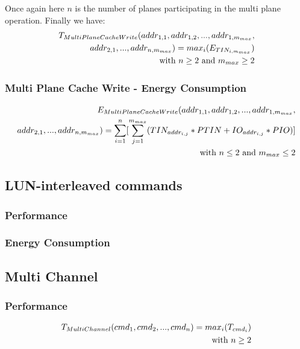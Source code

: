 \documentclass[oneside]{memoir}
\begin{document}
Once again here $n$ is the number of planes participating in the multi plane operation. Finally we have:
\begin{align}
T_{MultiPlaneCacheWrite} (addr_{1,1}, addr_{1,2}, ... , addr_{1,m_{max}}, 
\notag\\addr_{2,1}, ... , addr_{n,m_{max}}) = max_i(E_{TIN_{i, m_{max}}})
\notag\\\text{with } n \ge 2 \text{ and } m_{max} \ge 2
\end{align}


\subsubsection{Multi Plane Cache Write - Energy Consumption}
\begin{align}
E_{MultiPlaneCacheWrite} (addr_{1,1}, addr_{1,2}, ... , addr_{1,m_{max}}, 
\notag\\addr_{2,1}, ... , addr_{n,m_{max}}) = 
\sum\limits_{i=1}^{n} [\sum\limits_{j=1}^{m_{max}} (TIN_{addr_{i,j}}*PTIN + IO_{addr_{i,j}}*PIO)]
\notag\\\text{with } n \le 2 \text{ and } m_{max} \le 2
\end{align}

\subsection{LUN-interleaved commands}

\subsubsection{Performance}

\subsubsection{Energy Consumption}

\subsection{Multi Channel}

\subsubsection{Performance}

\begin{align}T_{MultiChannel}(cmd_1, cmd_2, ... , cmd_n) = max_i(T_{cmd_i})
\notag\\\text{with } n \ge 2
\end{align}
\end{document}
